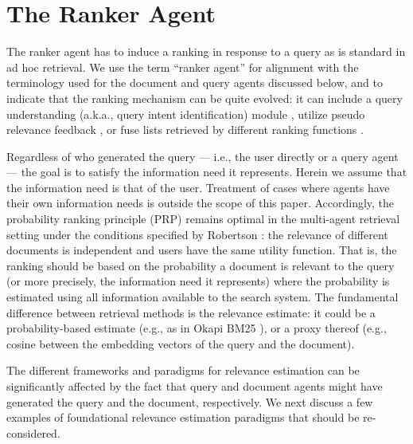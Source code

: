 \section{The Ranker Agent}
\label{sec:rankAgent}
The ranker agent has to induce a ranking in response to a query as is
standard in ad hoc retrieval. We use the term ``ranker agent'' for
alignment with the terminology used for the document and query agents discussed below,
and to indicate that the ranking mechanism can be quite evolved: it can include a query understanding (a.k.a.,
query intent identification) module \cite{Jansen+al:07a}, utilize
pseudo relevance feedback \cite{Xu+Croft:96a}, or fuse lists retrieved
by different ranking functions \cite{Kurland+Culpepper:18a}.



Regardless of who generated the query --- i.e., the user
directly or a query agent --- the goal is to satisfy the
information need it represents. Herein we assume that the information
need is that of the user. Treatment of cases where agents have their
own information needs is outside the scope of this paper. Accordingly,
the probability ranking principle (PRP) \cite{Robertson:77a} remains
optimal in the multi-agent retrieval setting under the conditions
specified by Robertson \cite{Robertson:77a}: the relevance of
different documents is independent and users have the same utility
function. That is, the ranking should be based on the probability a
document is relevant to the query (or more precisely, the information
need it represents) where the probability is estimated using all
information available to the search system. The fundamental difference
between retrieval methods is the relevance estimate: it could be a
probability-based estimate (e.g., as in Okapi BM25
\cite{Robertson:93a}), or a proxy thereof (e.g., cosine between the
embedding vectors of the query and the document).

The different
frameworks and paradigms for relevance estimation can be significantly affected by
the fact that query and document agents might have generated the
query and the document, respectively. We next discuss a few examples of foundational relevance estimation paradigms that should be re-considered.




